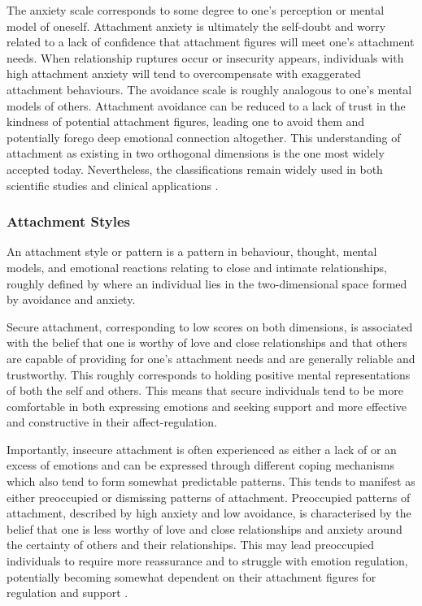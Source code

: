 \documentclass[12pt]{report}
\begin{document}
The anxiety scale corresponds to some degree to one's perception or mental model of oneself. Attachment anxiety is ultimately the self-doubt and worry related to a lack of confidence that attachment figures will meet one's attachment needs.
When relationship ruptures occur or insecurity appears, individuals with high attachment anxiety will tend to overcompensate with exaggerated attachment behaviours.
The avoidance scale is roughly analogous to one's mental models of others. Attachment avoidance can be reduced to a lack of trust in the kindness of potential attachment figures, leading one to avoid them and potentially forego deep emotional connection altogether.
This understanding of attachment as existing in two orthogonal dimensions is the one most widely accepted today.
Nevertheless, the classifications remain widely used in both scientific studies and clinical applications \cite{Mikulincer2013}.

\subsubsection*{Attachment Styles}
An attachment style or pattern is a pattern in behaviour, thought, mental models, and emotional reactions relating to close and intimate relationships, roughly defined by where an individual lies in the two-dimensional space formed by avoidance and anxiety.

Secure attachment, corresponding to low scores on both dimensions, is associated with the belief that one is worthy of love and close relationships and that others are capable of providing for one's attachment needs and are generally reliable and trustworthy.
This roughly corresponds to holding positive mental representations of both the self and others. This means that secure individuals tend to be more comfortable in both expressing emotions and seeking support and more effective and constructive in their affect-regulation.

Importantly, insecure attachment is often experienced as either a lack of or an excess of emotions and can be expressed through different coping mechanisms which also tend to form somewhat predictable patterns.
This tends to manifest as either preoccupied or dismissing patterns of attachment. Preoccupied patterns of attachment, described by high anxiety and low avoidance, is characterised by the belief that one is less worthy of love and close relationships and anxiety around the certainty of others and their relationships.
This may lead preoccupied individuals to require more reassurance and to struggle with emotion regulation, potentially becoming somewhat dependent on their attachment figures for regulation and support \cite{Hudson2020}.
\end{document}

